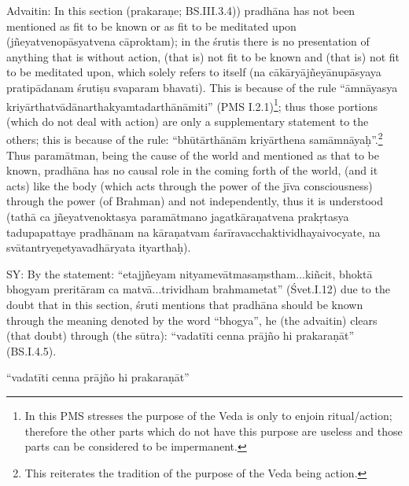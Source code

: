Advaitin: In this section (prakaraṇe; BS.III.3.4)) pradhāna has not been mentioned as fit to be known or as fit to be meditated upon (jñeyatvenopāsyatvena cāproktam); in the śrutis there is no presentation of anything that is without action, (that is) not fit to be known and (that is) not fit to be meditated upon, which solely refers to itself (na cākāryājñeyānupāsyaya pratipādanam śrutiṣu svaparam bhavati). This is because of the rule “āmnāyasya kriyārthatvādānarthakyamtadarthā\-nāmiti” (PMS I.2.1)\footnote{In this PMS stresses the purpose of the Veda is only to enjoin ritual/action; therefore the other parts which do not have this purpose are useless and those parts can be considered to be impermanent.}; thus those portions (which do not deal with action) are only a supplementary statement to the others; this is because of the rule: “bhūtārthānām kriyārthena samāmnāyaḥ”.\footnote{This reiterates the tradition of the purpose of the Veda being action.} Thus paramātman, being the cause of the world  and mentioned as that to be known, pradhāna has no causal role in the coming forth of the world, (and it acts) like the body (which acts through the power of the jīva consciousness) through the power (of Brahman) and not independently, thus it is understood (tathā ca jñeyatvenoktasya paramātmano jagat\-kāraṇatvena prakṛtasya tadupapattaye pradhānam na kāraṇatvam  śarī\-ravacchaktividhayaivocyate, na svātantryeṇetyavadhāryata ityarthaḥ).

SY: By the statement: “etajjñeyam  nityamevātmasaṃstham...kiñcit, bhoktā bhogyam preritāram ca matvā...trividham brahmametat” (Śvet.I.12)  due to the doubt that in this section, śruti mentions that pradhāna should be known through the meaning denoted by the word  “bhogya”, he (the advaitin) clears (that doubt) through (the sūtra): “vadatīti cenna prājño hi prakaraṇāt” (BS.I.4.5).

\vskip 4pt

\textbf{}


\vskip 2pt

“vadatīti cenna prājño hi prakaraṇāt”

\vskip 2pt

